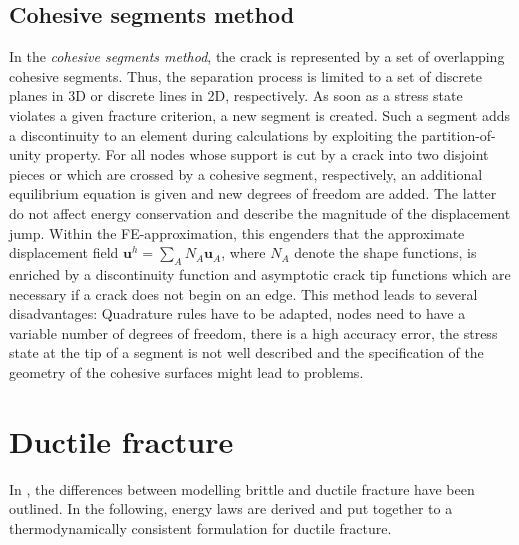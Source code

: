 \subsection{Cohesive segments method} \label{appsec:cohes}
In the \textit{cohesive segments method}, the crack is represented by a set of overlapping cohesive segments. Thus, the separation process is limited to a set of discrete planes in 3D or discrete lines in 2D, respectively. As soon as a stress state violates a given fracture criterion, a new segment is created. Such a segment adds a discontinuity to an element during calculations by exploiting the partition-of-unity property. For all nodes whose support is cut by a crack into two disjoint pieces or which are crossed by a cohesive segment, respectively, an additional equilibrium equation is given and new degrees of freedom are added. The latter do not affect energy conservation and describe the magnitude of the displacement jump. Within the FE-approximation, this engenders that the approximate displacement field $\mathbf{u}^{h}=\sum_{A}N_{A}\mathbf{u}_{A}$, where $N_{A}$ denote the shape functions, is enriched by a discontinuity function and asymptotic crack tip functions which are necessary if a crack does not begin on an edge. This method leads to several disadvantages: Quadrature rules have to be adapted, nodes need to have a variable number of degrees of freedom, there is a high accuracy error, the stress state at the tip of a segment is not well described and the specification of the geometry of the cohesive surfaces might lead to problems. \cite{02_SotA_cohes}\cite{01_SotA_cohes_dyn}

\section{Ductile fracture} \label{appsec:ductile}
In , the differences between modelling brittle and ductile fracture have been outlined. In the following, energy laws are derived and put together to a thermodynamically consistent formulation for ductile fracture.

